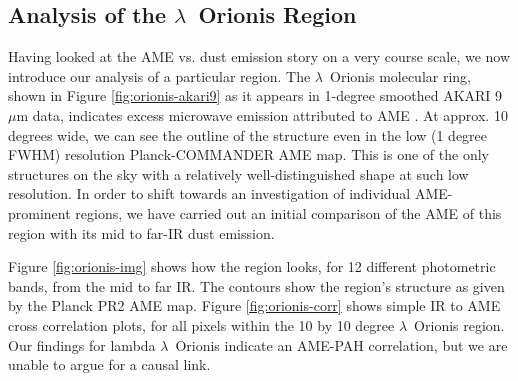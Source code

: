 \documentclass[preprint2,longabstract]{aastex}
\begin{document}
\subsection{Analysis of the $\lambda$~Orionis Region}

	Having looked at the AME vs. dust emission story on a very course scale, we now introduce our analysis of a particular region. The $\lambda$~Orionis molecular ring, shown in Figure \ref{fig:orionis-akari9} as it appears in 1-degree smoothed AKARI 9~$\mu$m data, indicates excess microwave emission attributed to AME \citep{planck15XXV}. At approx. 10 degrees wide, we can see the outline of the structure even in the low (1 degree FWHM) resolution Planck-COMMANDER AME map. This is one of the only structures on the sky with a relatively well-distinguished shape at such low resolution. In order to shift towards an investigation of individual AME-prominent regions, we have carried out an initial comparison of the AME of this region with its mid to far-IR dust emission. 
    
	Figure \ref{fig:orionis-img} shows how the region looks, for 12 different photometric bands, from the mid to far IR. The contours show the region's structure as given by the Planck PR2 AME map. Figure \ref{fig:orionis-corr} shows simple IR to AME cross correlation plots, for all pixels within the 10 by 10 degree $\lambda$~Orionis region. Our findings for lambda $\lambda$~Orionis indicate an AME-PAH correlation, but we are unable to argue for a causal link.
\end{document}
